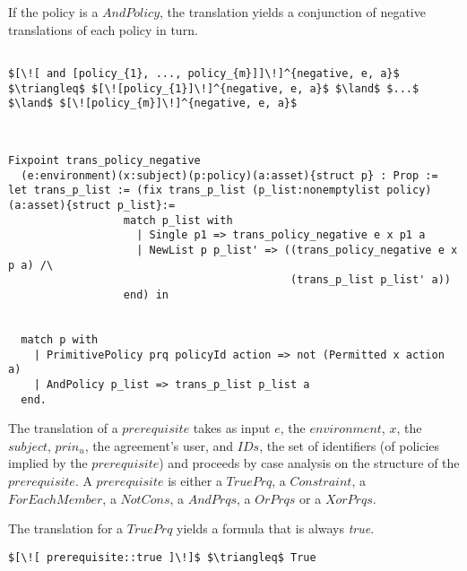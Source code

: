 If the policy is a $AndPolicy$, the translation yields a conjunction of negative translations of each policy in turn.

\lstset{mathescape, language=AST}  
\begin{lstlisting}[frame=single, caption={Negative Policy Translation {$\colon$} List of policies},label={lst:transpolicynegativeListOfPolicies}]

$[\![ and [policy_{1}, ..., policy_{m}]]\!]^{negative, e, a}$ $\triangleq$ $[\![policy_{1}]\!]^{negative, e, a}$ $\land$ $...$ $\land$ $[\![policy_{m}]\!]^{negative, e, a}$


\end{lstlisting}

\begin{lstlisting}

Fixpoint trans_policy_negative
  (e:environment)(x:subject)(p:policy)(a:asset){struct p} : Prop :=
let trans_p_list := (fix trans_p_list (p_list:nonemptylist policy)(a:asset){struct p_list}:=
                  match p_list with
                    | Single p1 => trans_policy_negative e x p1 a
                    | NewList p p_list' => ((trans_policy_negative e x p a) /\ 
                                            (trans_p_list p_list' a))
                  end) in


  match p with
    | PrimitivePolicy prq policyId action => not (Permitted x action a)
    | AndPolicy p_list => trans_p_list p_list a
  end.

\end{lstlisting}

The translation of a $prerequisite$ takes as input $e$, the $environment$, $x$, the $subject$, $prin_{u}$, the agreement's user, and $IDs$, the set of identifiers (of policies implied by the $prerequisite$) and proceeds by case analysis on the structure of the $prerequisite$. A $prerequisite$ is either a $TruePrq$, a $Constraint$, a $ForEachMember$, a $NotCons$, a $AndPrqs$, a $OrPrqs$ or a $XorPrqs$.

The translation for a $TruePrq$ yields a formula that is always \emph{true}.

\lstset{mathescape, language=AST}  
\begin{lstlisting}[frame=single, caption={Prerequisite Translation {$\colon$} Always True Prerequisite},label={lst:transpreRequisiteTruePrq}]
	$[\![ prerequisite::true ]\!]$ $\triangleq$ True
\end{lstlisting}

